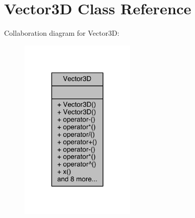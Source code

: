 \hypertarget{class_vector3_d}{}\section{Vector3D Class Reference}
\label{class_vector3_d}


Collaboration diagram for Vector3D\+:
\nopagebreak
\begin{figure}[H]
\begin{center}
\leavevmode
\includegraphics[width=155pt]{doxygen/latex/class_vector3_d__coll__graph}
\end{center}
\end{figure}

